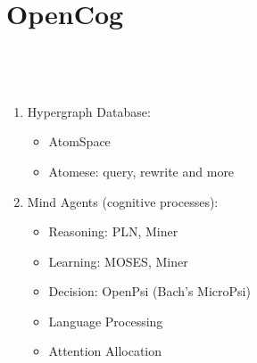 \documentclass[aspectratio=169]{beamer}
\begin{document}
\section {OpenCog}

\begin{frame}





  \\[0.5cm]

  \begin{columns}
    \column{3in}

    \begin{enumerate}
    \item Hypergraph Database:
      \begin{itemize}
      \item AtomSpace
      \item Atomese: query, rewrite and more
      \end{itemize}
    \item Mind Agents (cognitive processes):
      \begin{itemize}
      \item \alert{Reasoning: PLN, Miner}
      \item Learning: MOSES, Miner
      \item Decision: OpenPsi (Bach's MicroPsi)
      \item Language Processing
      \item Attention Allocation
      \end{itemize}
    \end{enumerate}

    \column{3in}


\end{columns}
\end{frame}
\end{document}

